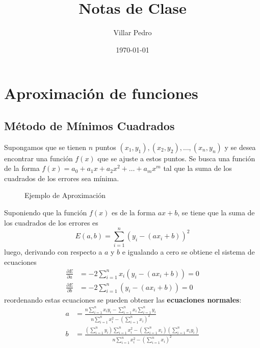 \documentclass{article}
\title{Notas de Clase}
\author{Villar Pedro}
\date{\today}
\begin{document}
\maketitle
\newpage
\tableofcontents
\newpage
\section[Unidad 4 - Aproximación de Funciones]{Aproximación de funciones}
\subsection[Aproximación con n puntos]{Método de Mínimos Cuadrados}
Supongamos que se tienen $n$ puntos $(x_1, y_1), (x_2, y_2), \dots, (x_n, y_n)$ y se desea encontrar una función $f(x)$ que se ajuste a estos puntos. Se busca una función de la forma $f(x) = a_0 + a_1x + a_2x^2 + \dots + a_mx^m$ tal que la suma de los cuadrados de los errores sea mínima. 
\begin{figure}[h]
    \centering
    \caption{Ejemplo de Aproximación}
    \label{fig:myplot}
\end{figure}
Suponiendo que la función $f(x)$ es de la forma $ax+b$, se tiene que la suma de los cuadrados de los errores es
\begin{equation}
    E(a,b) = \sum_{i=1}^{n} (y_i - (ax_i + b))^2
\end{equation}
luego, derivando con respecto a $a$ y $b$ e igualando a cero se obtiene el sistema de ecuaciones
\begin{align}
    \frac{\partial E}{\partial a} &= -2\sum_{i=1}^{n} x_i(y_i - (ax_i + b)) = 0 \\
    \frac{\partial E}{\partial b} &= -2\sum_{i=1}^{n} (y_i - (ax_i + b)) = 0
\end{align}
reordenando estas ecuaciones se pueden obtener las \textbf{ecuaciones normales}:
\begin{align}
    a &= \frac{n\sum_{i=1}^{n} x_iy_i - \sum_{i=1}^{n} x_i \sum_{i=1}^{n} y_i}{n\sum_{i=1}^{n} x_i^2 - (\sum_{i=1}^{n} x_i)^2} \\
    b &= \frac{(\sum_{i=1}^{n} y_i)\sum_{i=1}^{n} x_i^2 - (\sum_{i=1}^{n} x_i)(\sum_{i=1}^{n} x_iy_i)}{n\sum_{i=1}^{n} x_i^2 - (\sum_{i=1}^{n} x_i)^2}
\end{align}
\newpage
\end{document}
